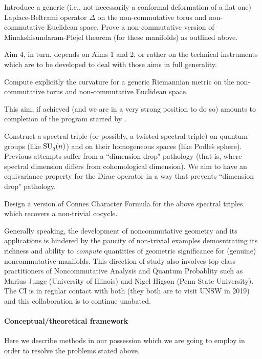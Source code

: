 \documentclass[12pt]{article}
\begin{document}
 Introduce a generic (i.e., not necessarily a conformal deformation of a flat one) Laplace-Beltrami operator $\Delta$ on the non-commutative torus and non-commutative Euclidean space. Prove a non-commutative version of Minakshisundaram-Plejel theorem (for these manifolds) as outlined above.

Aim 4, in turn, depends on Aims 1 and 2, or rather on the technical instruments which are to be developed to deal with those aims in full generality.

 Compute explicitly the curvature for a generic Riemannian metric on the non-commutative torus and non-commutative Euclidean space.

This aim, if achieved (and we are in a very strong position to do so) amounts to completion of the program started by \cite{ChakrabortyPal,Connes-suq2,NeshTus}.

 Construct a spectral triple (or possibly, a twisted spectral triple) on quantum groups (like ${\rm SU}_q(n)$) and on their homogeneous spaces (like Podle\`s sphere). Previous attempts \cite{ChakrabortyPal} suffer from a ``dimension drop" pathology (that is, where spectral dimension differs from cohomological dimension). We aim to have an equivariance property for the Dirac operator in a way that prevents ``dimension drop" pathology. 


 Design a version of Connes Character Formula for the above spectral triples which recovers a non-trivial cocycle.

Generally speaking, the development of noncommutative geometry and its applications is hindered by the paucity of non-trivial examples demosntrating its richness and ability to {\it compute} quantities of geometric significance for (genuine) noncommutative manifolds. This direction of study also involves top class practitioners of Noncommutative Analysis and Quantum Probablity such as Marius Junge (University of Illinois) and Nigel Higson (Penn State University). The CI is in regular contact with both (they both are to visit UNSW in 2019) and this collaboration is to continue unabated.


\paragraph*{{\color{green} Conceptual/theoretical framework}} Here we describe methods in our possession which we are going to employ in order to resolve the problems stated above.
\end{document}
